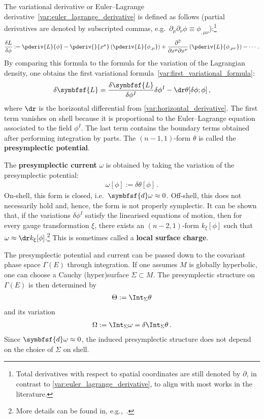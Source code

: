     The variational derivative or Euler--Lagrange derivative~\eqref{var:euler_lagrange_derivative} is defined as follows (partial derivatives are denoted by subscripted commas, e.g.~$\partial_\mu\partial_\nu\phi\equiv\phi_{,\mu\nu}$):\footnote{Total derivatives with respect to spatial coordinates are still denoted by $\partial$, in contrast to \cref{var:euler_lagrange_derivative}, to align with most works in the literature.}
    \begin{gather}
        \frac{\delta L}{\delta \phi} := \pderiv{L}{\phi} - \pderiv{}{x^\mu}\left(\pderiv{L}{\phi_{,\mu}}\right) + \frac{\partial^2}{\partial x^\mu\partial x^\nu}\left(\pderiv{L}{\phi_{,\mu\nu}}\right) -\cdots\,.
    \end{gather}
    By comparing this formula to the formula for the variation of the Lagrangian density, one obtains the first variational formula~\eqref{var:first_variational_formula}:
    \begin{gather}
        \label{field:variational_formula}
        \delta\symbfsf{L} = \frac{\delta\symbfsf{L}}{\delta\phi^I}\delta\phi^I - \dr\theta[\delta\phi;\phi]\,,
    \end{gather}
    where $\dr$ is the horizontal differential from \cref{var:horizontal_derivative}. The first term vanishes on shell because it is proportional to the Euler--Lagrange equation associated to the field $\phi^I$. The last term contains the boundary terms obtained after performing integration by parts. The $(n-1,1)$-form $\theta$ is called the \textbf{presymplectic potential}.

    The \textbf{presymplectic current} $\omega$ is obtained by taking the variation of the presymplectic potential:
    \begin{gather}
        \omega[\phi] := \delta\theta[\phi]\,.
    \end{gather}
    On-shell, this form is closed, i.e.~$\symbfsf{d}\omega\approx0$. Off-shell, this does not necessarily hold and, hence, the form is not properly symplectic. It can be shown that, if the variations $\delta\phi^I$ satisfy the linearised equations of motion, then for every gauge transformation $\xi$, there exists an $(n-2,1)$-form $k_\xi[\phi]$ such that $\omega\approx\dr k_\xi[\phi]$.\footnote{More details can be found in, e.g.,~\cite{compere_advanced_2019}.} This is sometimes called a \textbf{local surface charge}.

    The presymplectic potential and current can be passed down to the covariant phase space $\Gamma(E)$ through integration. If one assumes $M$ is globally hyperbolic, one can choose a Cauchy (hyper)surface $\Sigma\subset M$. The presymplectic structure on $\Gamma(E)$ is then determined by
    \begin{gather}
        \Theta := \Int_\Sigma\theta
    \end{gather}
    and its variation
    \begin{gather}
        \Omega := \Int_\Sigma\omega = \delta\Int_\Sigma\theta\,.
    \end{gather}
    Since $\symbfsf{d}\omega\approx0$, the induced presymplectic structure does not depend on the choice of $\Sigma$ on shell.

